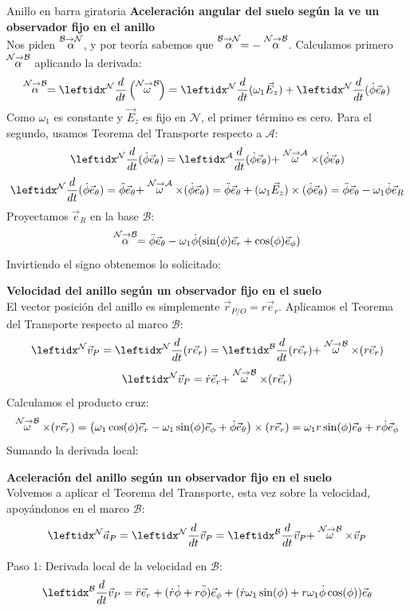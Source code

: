 \begin{solucion}{Anillo en barra giratoria}
\textbf{Aceleración angular del suelo según la ve un observador fijo en el anillo}\\
Nos piden $\stackrel{\mathcal{B} \to \mathcal{N}}{\alpha}$, y por teoría sabemos que $\stackrel{\mathcal{B} \to \mathcal{N}}{\alpha} = -\stackrel{\mathcal{N} \to \mathcal{B}}{\alpha}$.
Calculamos primero $\stackrel{\mathcal{N} \to \mathcal{B}}{\alpha}$ aplicando la derivada:
$$\accang{N}{B} = \der{}{N}\left(\velang{N}{B}\right) = \der{(\omega_1\vec{E}_z)}{N}{} + \der{(\dot\phi\vec{e}_\theta)}{N}{}$$
Como $\omega_1$ es constante y $\vec{E}_z$ es fijo en $\mathcal{N}$, el primer término es cero. Para el segundo, usamos Teorema del Transporte respecto a $\mathcal{A}$:
$$\der{(\dot\phi\vec{e}_\theta)}{N} = \transporta{(\dot\phi\vec{e}_\theta)}{N}{A}$$
$$\der{(\dot\phi\vec{e}_\theta)}{N} = \ddot\phi\vec{e}_\theta + \velang{N}{A}\times(\dot\phi\vec{e}_\theta) = \ddot\phi\vec{e}_\theta + (\omega_1\vec{E}_z)\times(\dot\phi\vec{e}_\theta) = \ddot\phi\vec{e}_\theta - \omega_1\dot\phi\vec{e}_R$$
Proyectamos $\vec{e}_R$ en la base $\mathcal{B}$:
$$\stackrel{\mathcal{N} \to \mathcal{B}}{\alpha} = \ddot\phi\vec{e}_\theta - \omega_1\dot\phi(\sin(\phi)\vec{e}_r + \cos(\phi)\vec{e}_\phi)$$
Invirtiendo el signo obtenemos lo solicitado:

\textbf{Velocidad del anillo según un observador fijo en el suelo}\\
El vector posición del anillo es simplemente $\vec{r}_{P/O} = r\vec{e}_r$. Aplicamos el Teorema del Transporte respecto al marco $\mathcal{B}$:
$$\marc{\vec{v}_P}{N} = \der{(r\vec{e}_r)}{N} = \transporta{(r\vec{e}_r)}{N}{B}$$
$$\marc{\vec{v}_P}{N} = \dot{r}\vec{e}_r + \velang{N}{B}\times(r\vec{e}_r)$$
Calculamos el producto cruz:
$$\stackrel{\mathcal{N} \to \mathcal{B}}{\omega}\times(r\vec{e}_r) = \left(\omega_1\cos(\phi)\vec{e}_r - \omega_1\sin(\phi)\vec{e}_\phi + \dot\phi\vec{e}_\theta\right) \times (r\vec{e}_r) = \omega_1 r \sin(\phi)\vec{e}_\theta + r\dot\phi\vec{e}_\phi$$
Sumando la derivada local:

\textbf{Aceleración del anillo según un observador fijo en el suelo}\\
Volvemos a aplicar el Teorema del Transporte, esta vez sobre la velocidad, apoyándonos en el marco $\mathcal{B}$:
$$\marc{\vec{a}_P}{N} = \der{\vec{v}_P}{N} = \transporta{\vec{v}_P}{N}{B}$$

Paso 1: Derivada local de la velocidad en $\mathcal{B}$:
$$\der{\vec{v}_P}{B} = \ddot{r}\vec{e}_r + (\dot{r}\dot\phi + r\ddot\phi)\vec{e}_\phi + (\dot{r}\omega_1\sin(\phi) + r\omega_1\dot\phi\cos(\phi))\vec{e}_\theta$$


\end{solucion}
